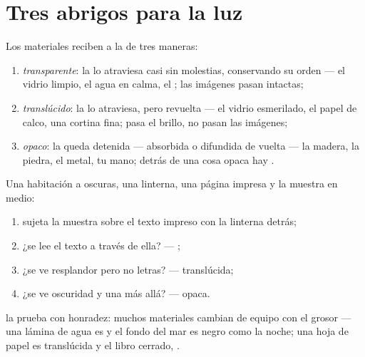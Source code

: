 \section{Tres abrigos para la luz}

\begin{definition}\label{def:g7:light-sources-propagation:coats}
Los materiales reciben a la  de tres maneras:
\begin{enumerate}
  \item \emph{transparente}: la  lo
        atraviesa casi sin molestias, conservando su orden --- el
        vidrio limpio, el agua en calma, el ; las
        imágenes pasan intactas;
  \item \emph{translúcido}: la  lo
        atraviesa, pero revuelta --- el vidrio esmerilado, el papel
        de calco, una cortina fina; pasa el brillo, no pasan las
        imágenes;
  \item \emph{opaco}: la  queda detenida ---
        absorbida o difundida de vuelta --- la madera, la piedra, el
        metal, tu mano; detrás de una cosa opaca hay .
\end{enumerate}
\end{definition}

\begin{method}\label{met:g7:light-sources-propagation:sort}
Una habitación a oscuras, una linterna, una página impresa y la
muestra en medio:
\begin{enumerate}
  \item sujeta la muestra sobre el texto impreso con la linterna
        detrás;
  \item ¿se lee el texto a través de ella? --- ;
  \item ¿se ve resplandor pero no letras? --- translúcida;
  \item ¿se ve oscuridad y una  más allá? ---
        opaca.
\end{enumerate}
 la prueba con honradez: muchos materiales cambian de equipo con el
grosor --- una lámina de agua es  y el fondo del mar
es negro como la noche; una hoja de papel es translúcida y el
libro cerrado, .
\end{method}

